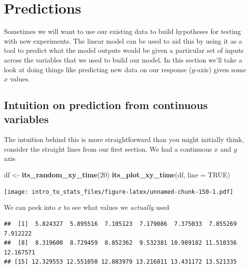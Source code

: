 \documentclass[
]{book}
\newenvironment{Shaded}{\begin{snugshade}}{\end{snugshade}}
\newcommand{\DataTypeTok}[1]{\textcolor[rgb]{0.13,0.29,0.53}{#1}}
\newcommand{\DecValTok}[1]{\textcolor[rgb]{0.00,0.00,0.81}{#1}}
\newcommand{\KeywordTok}[1]{\textcolor[rgb]{0.13,0.29,0.53}{\textbf{#1}}}
\newcommand{\NormalTok}[1]{#1}
\newcommand{\OperatorTok}[1]{\textcolor[rgb]{0.81,0.36,0.00}{\textbf{#1}}}
\newcommand{\OtherTok}[1]{\textcolor[rgb]{0.56,0.35,0.01}{#1}}
\newcommand{\StringTok}[1]{\textcolor[rgb]{0.31,0.60,0.02}{#1}}
\begin{document}
\hypertarget{predictions}{%
\section{Predictions}\label{predictions}}

Sometimes we will want to use our existing data to build hypotheses for testing with new experiments. The linear model can be used to aid this by using it as a tool to predict what the model outputs would be given a particular set of inputs across the variables that we used to build our model. In this section we'll take a look at doing things like predicting new data on our response (\(y\)-axis) given some \(x\) values.

\hypertarget{intuition-on-prediction-from-continuous-variables}{%
\subsection{Intuition on prediction from continuous variables}\label{intuition-on-prediction-from-continuous-variables}}

The intuition behind this is more straightforward than you might initially think, consider the straight lines from our first section. We had a continuous \(x\) and \(y\) axis

\begin{Shaded}
\begin{Highlighting}[]
\NormalTok{df <-}\StringTok{ }\KeywordTok{its_random_xy_time}\NormalTok{(}\DecValTok{20}\NormalTok{)}
\KeywordTok{its_plot_xy_time}\NormalTok{(df, }\DataTypeTok{line =} \OtherTok{TRUE}\NormalTok{)}
\end{Highlighting}
\end{Shaded}

\texttt{[image: intro\_to\_stats\_files/figure-latex/unnamed-chunk-150-1.pdf]}

We can peek into \(x\) to see what values we \emph{actually} used

\begin{Shaded}
\end{Shaded}

\begin{verbatim}
##  [1]  5.824327  5.895516  7.105123  7.179086  7.375033  7.855269  7.912222
##  [8]  8.319600  8.729459  8.852362  9.532381 10.989182 11.510336 12.167571
## [15] 12.329553 12.551050 12.883979 13.216811 13.431172 13.521335
\end{verbatim}
\end{document}
